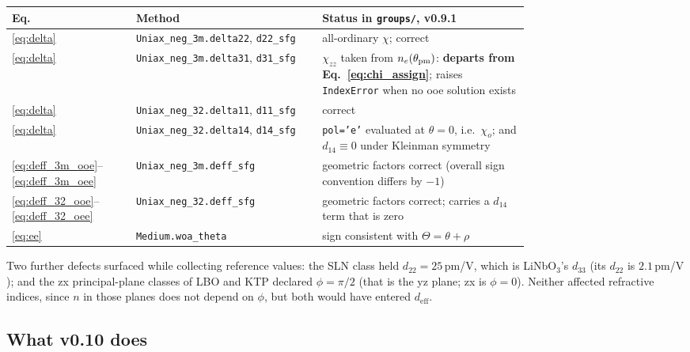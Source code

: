 \documentclass[aps,pra,preprint,amsmath,amssymb,nofootinbib,superscriptaddress]{revtex4-2}
\newcommand{\ueff}{d_{\mathrm{eff}}}
\begin{document}
\begin{center}
\begin{tabular}{@{}lp{0.36\linewidth}p{0.40\linewidth}@{}}
\toprule
Eq. & Method & Status in \texttt{groups/}, v0.9.1\\
\midrule
\eqref{eq:delta} & \texttt{Uniax\_neg\_3m.delta22}, \texttt{d22\_sfg} & all-ordinary $\chi$; correct\\
\eqref{eq:delta} & \texttt{Uniax\_neg\_3m.delta31}, \texttt{d31\_sfg} & $\chi_{zz}$ taken from $n_e(\theta_{\rm pm})$: \textbf{departs from Eq.~\eqref{eq:chi_assign}}; raises \texttt{IndexError} when no ooe solution exists\\
\eqref{eq:delta} & \texttt{Uniax\_neg\_32.delta11}, \texttt{d11\_sfg} & correct\\
\eqref{eq:delta} & \texttt{Uniax\_neg\_32.delta14}, \texttt{d14\_sfg} & \texttt{pol='e'} evaluated at $\theta=0$, i.e.\ $\chi_o$; and $d_{14}\equiv0$ under Kleinman symmetry\\
\eqref{eq:deff_3m_ooe}--\eqref{eq:deff_3m_oee} & \texttt{Uniax\_neg\_3m.deff\_sfg} & geometric factors correct (overall sign convention differs by $-1$)\\
\eqref{eq:deff_32_ooe}--\eqref{eq:deff_32_oee} & \texttt{Uniax\_neg\_32.deff\_sfg} & geometric factors correct; carries a $d_{14}$ term that is zero\\
\eqref{eq:ee} & \texttt{Medium.woa\_theta} & sign consistent with $\Theta=\theta+\rho$\\
\bottomrule
\end{tabular}
\end{center}

Two further defects surfaced while collecting reference values: the SLN
class held $d_{22}=25$\,pm/V, which is LiNbO$_3$'s $d_{33}$ (its $d_{22}$
is $2.1$\,pm/V \cite{Roberts1992}); and the zx principal-plane classes of
LBO and KTP declared $\phi=\pi/2$ (that is the yz plane; zx is $\phi=0$).
Neither affected refractive indices, since $n$ in those planes does not
depend on $\phi$, but both would have entered $\ueff$.

\subsection{What v0.10 does}
\end{document}
